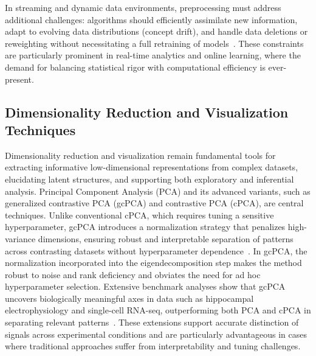 \documentclass[sigconf]{acmart}
\begin{document}
In streaming and dynamic data environments, preprocessing must address additional challenges: algorithms should efficiently assimilate new information, adapt to evolving data distributions (concept drift), and handle data deletions or reweighting without necessitating a full retraining of models~\cite{ref76,ref79,ref80,ref86}. These constraints are particularly prominent in real-time analytics and online learning, where the demand for balancing statistical rigor with computational efficiency is ever-present.

\subsection{Dimensionality Reduction and Visualization Techniques}

Dimensionality reduction and visualization remain fundamental tools for extracting informative low-dimensional representations from complex datasets, elucidating latent structures, and supporting both exploratory and inferential analysis. Principal Component Analysis (PCA) and its advanced variants, such as generalized contrastive PCA (gcPCA) and contrastive PCA (cPCA), are central techniques. Unlike conventional cPCA, which requires tuning a sensitive hyperparameter, gcPCA introduces a normalization strategy that penalizes high-variance dimensions, ensuring robust and interpretable separation of patterns across contrasting datasets without hyperparameter dependence~\cite{ref97,ref99}. In gcPCA, the normalization incorporated into the eigendecomposition step makes the method robust to noise and rank deficiency and obviates the need for ad hoc hyperparameter selection. Extensive benchmark analyses show that gcPCA uncovers biologically meaningful axes in data such as hippocampal electrophysiology and single-cell RNA-seq, outperforming both PCA and cPCA in separating relevant patterns~\cite{ref99}. These extensions support accurate distinction of signals across experimental conditions and are particularly advantageous in cases where traditional approaches suffer from interpretability and tuning challenges.
\end{document}
